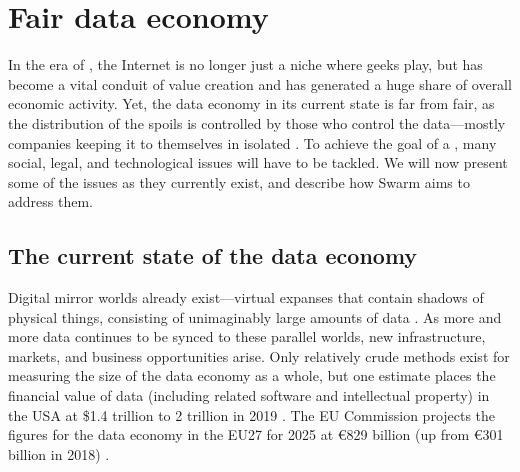 \section{Fair data economy  \statusgreen}\label{sec:fair-data}
\green{}

In the era of , the Internet is no longer just a niche where geeks play, but has become a vital conduit of value creation and has generated a huge share of overall economic activity. Yet, the data economy in its current state is far from fair, as the distribution of the spoils is controlled by those who control the data—mostly companies keeping it to themselves in isolated . To achieve the goal of a , many social, legal, and technological issues will have to be tackled. We will now present some of the issues as they currently exist, and describe how Swarm aims to address them. 

\subsection{The current state of the data economy  \statusgreen} \label{sec:dataeconomy}

Digital mirror worlds already exist---virtual expanses that contain shadows of physical things, consisting of unimaginably large amounts of data \cite{MirrorWorlds2020Feb}. As more and more data continues to be synced to these parallel worlds, new infrastructure, markets, and business opportunities arise. Only relatively crude methods exist for measuring the size of the data economy as a whole, but one estimate places the financial value of data (including related software and intellectual property) in the USA at \$1.4 trillion to 2 trillion in 2019 \cite{MirrorWorlds2020Feb}. The EU Commission projects the figures for the data economy in the EU27 for 2025 at €829 billion (up from €301 billion in 2018) \cite{EUDataStrategy2020Feb}. 

